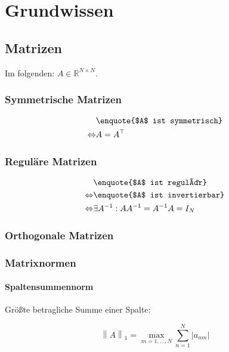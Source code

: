 \documentclass[a4paper, 14pt]{article}
\newcommand{\norm}[1]{\left\lVert#1\right\rVert}
\begin{document}
	\section{Grundwissen}

	\subsection{Matrizen}

	Im folgenden: $A \in \mathbb{R}^{N \times N}$.

	\subsubsection{Symmetrische Matrizen}

	\begin{align}
		& \textrm{\enquote{$A$ ist symmetrisch}} \\
		\Leftrightarrow & A = A^\top
	\end{align}

	\subsubsection{Reguläre Matrizen}

	\begin{align}
		& \textrm{\enquote{$A$ ist regulär}} \\
		\Leftrightarrow & \textrm{\enquote{$A$ ist invertierbar}} \\
		\Leftrightarrow & \exists A^{-1} : A A^{-1} =  A^{-1} A = I_N
	\end{align}

	\subsubsection{Orthogonale Matrizen}

	\subsubsection{Matrixnormen}

	\paragraph{Spaltensummennorm}

	Größte betragliche Summe einer Spalte:

	\begin{equation}
		\norm{A}_1 = \max_{m = 1, ..., N}{\sum_{n = 1}^N{|a_{nm}|}}
	\end{equation}
\end{document}
